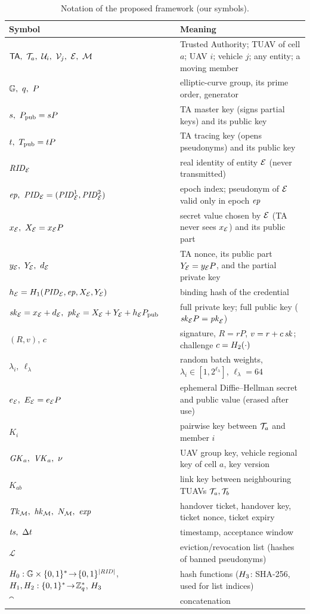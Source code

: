 \begin{table}[H]
\centering\small
\caption{Notation of the proposed framework (our symbols).}
\label{tab:notation}
\begin{tabularx}{\linewidth}{@{}l>{\raggedright\arraybackslash}X@{}}
\toprule
Symbol & Meaning\\
\midrule
$\TA,\ \Ta,\ \U_i,\ \V_j,\ \Ent,\ \M$ & Trusted Authority; TUAV of cell $a$; UAV $i$; vehicle $j$; any entity; a moving member\\
$\G,\ q,\ P$ & elliptic-curve group, its prime order, generator\\
$s,\ \Ppub=sP$ & TA master key (signs partial keys) and its public key\\
$t,\ \Tpub=tP$ & TA tracing key (opens pseudonyms) and its public key\\
$\mathit{RID}_{\mathcal{E}}$ & real identity of entity $\mathcal{E}$ (never transmitted)\\
$\ep,\ \PID_\Ent=(\PID^1_\Ent,\PID^2_\Ent)$ & epoch index; pseudonym of $\mathcal{E}$ valid only in epoch $\mathit{ep}$\\
$x_\Ent,\ X_\Ent=x_\Ent P$ & secret value chosen by $\mathcal{E}$ (TA never sees $x_{\mathcal{E}}$) and its public part\\
$y_\Ent,\ Y_\Ent,\ d_\Ent$ & TA nonce, its public part $Y_{\mathcal{E}}=y_{\mathcal{E}} P$, and the partial private key\\
$h_{\mathcal{E}}=H_1(\mathit{PID}_{\mathcal{E}},\mathit{ep},X_{\mathcal{E}},Y_{\mathcal{E}})$ & binding hash of the credential\\
$\sk_\Ent=x_\Ent+d_\Ent,\ \pk_\Ent=X_\Ent+Y_\Ent+h_\Ent\Ppub$ & full private key; full public key ($\mathit{sk}_{\mathcal{E}} P=\mathit{pk}_{\mathcal{E}}$)\\
$(R,v)$, $c$ & signature, $R=rP$, $v=r+c\,\mathit{sk}$; challenge $c=H_2(\cdot)$\\
$\lambda_i,\ \ell_\lambda$ & random batch weights, $\lambda_i\in[1,2^{\ell_\lambda}]$, $\ell_\lambda=64$\\
$e_\Ent,\ E_\Ent=e_\Ent P$ & ephemeral Diffie--Hellman secret and public value (erased after use)\\
$K_i$ & pairwise key between $\mathcal{T}_a$ and member $i$\\
$\GK_a,\ \VK_a,\ \nu$ & UAV group key, vehicle regional key of cell $a$, key version\\
$K_{ab}$ & link key between neighbouring TUAVs $\mathcal{T}_a,\mathcal{T}_b$\\
$\Tk_\M,\ \hk_\M,\ N_\M,\ \mathit{exp}$ & handover ticket, handover key, ticket nonce, ticket expiry\\
$\mathit{ts},\ \Delta t$ & timestamp, acceptance window\\
$\mathcal{L}$ & eviction/revocation list (hashes of banned pseudonyms)\\
$H_0:\mathbb{G}\times\{0,1\}^*\!\to\!\{0,1\}^{|\mathit{RID}|}$, $H_1,H_2:\{0,1\}^*\!\to\!\mathbb{Z}_q^{*}$, $H_3$ & hash functions ($H_3$: SHA-256, used for list indices)\\
$\cat$ & concatenation\\
\bottomrule
\end{tabularx}
\end{table}
